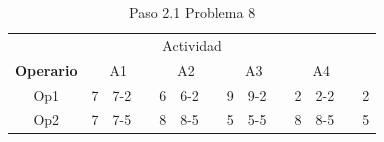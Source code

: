 \documentclass[12pt]{article}  %
\begin{document}
\begin{table}[H]
\centering
\caption{Paso 2.1 Problema 8}
\label{tab:Paso2.1Prob8}
\begin{tabular}{ccclcclcclcclc}
\multicolumn{14}{c}{Actividad}                                                                                                                                                                                                                                                                                                                                                                                                                                                                                                                                                                                                                                                     \\ \cline{2-13}
\multicolumn{1}{c|}{\textbf{Operario}} & \multicolumn{3}{c|}{A1}                                                                                                                           & \multicolumn{3}{c|}{A2}                                                                                                                           & \multicolumn{3}{c|}{A3}                                                                                                                           & \multicolumn{3}{c|}{A4}                                                                                                                           & \multicolumn{1}{l}{}      \\ \cline{2-13}
\multicolumn{1}{c|}{Op1}               & \multicolumn{1}{c|}{\cellcolor[HTML]{67FD9A}7} & \multicolumn{1}{c|}{\cellcolor[HTML]{FFCC67}7-2} & \multicolumn{1}{l|}{\cellcolor[HTML]{FCFF2F}} & \multicolumn{1}{c|}{\cellcolor[HTML]{67FD9A}6} & \multicolumn{1}{c|}{\cellcolor[HTML]{FFCC67}6-2} & \multicolumn{1}{l|}{\cellcolor[HTML]{F8FF00}} & \multicolumn{1}{c|}{\cellcolor[HTML]{67FD9A}9} & \multicolumn{1}{c|}{\cellcolor[HTML]{FFCC67}9-2} & \multicolumn{1}{l|}{\cellcolor[HTML]{F8FF00}} & \multicolumn{1}{c|}{\cellcolor[HTML]{67FD9A}2} & \multicolumn{1}{c|}{\cellcolor[HTML]{FFC702}2-2} & \multicolumn{1}{l|}{\cellcolor[HTML]{F8FF00}} & \cellcolor[HTML]{FFCCC9}2 \\ \cline{2-13}
\multicolumn{1}{c|}{Op2}               & \multicolumn{1}{c|}{\cellcolor[HTML]{67FD9A}7} & \multicolumn{1}{c|}{\cellcolor[HTML]{FFCC67}7-5} & \multicolumn{1}{l|}{\cellcolor[HTML]{FCFF2F}} & \multicolumn{1}{c|}{\cellcolor[HTML]{67FD9A}8} & \multicolumn{1}{c|}{\cellcolor[HTML]{FFCC67}8-5} & \multicolumn{1}{l|}{\cellcolor[HTML]{F8FF00}} & \multicolumn{1}{c|}{\cellcolor[HTML]{67FD9A}5} & \multicolumn{1}{c|}{\cellcolor[HTML]{FFCC67}5-5} & \multicolumn{1}{l|}{\cellcolor[HTML]{F8FF00}} & \multicolumn{1}{c|}{\cellcolor[HTML]{67FD9A}8} & \multicolumn{1}{c|}{\cellcolor[HTML]{FFC702}8-5} & \multicolumn{1}{l|}{\cellcolor[HTML]{F8FF00}} & \cellcolor[HTML]{FFCCC9}5 \\ \cline{2-13}

\end{tabular}
\end{table}
\end{document}
